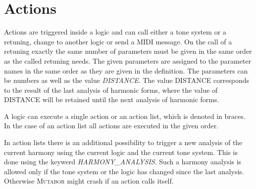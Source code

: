     

\section{Actions}\label{sec:aktionen}

Actions are triggered inside a logic and can call either a
tone system or a retuning, change to another logic or send a MIDI
message. On the call of a retuning exactly the same number of
parameters must be given in the same order as the
called retuning needs. The given parameters are assigned to the
parameter names in the same order as they are given in the
definition. The parameters can be numbers as well as the value
\textit{DISTANCE}. The value DISTANCE corresponds to
the result of the last analysis of harmonic forms, where the value of
DISTANCE will be retained until the next analysis of harmonic forms.

\iffalse
Aktionen werden innerhalb einer Logik ausgelöst und können wahlweise
ein Tonsystem aufrufen, eine Umstimmung aufrufen,
zu einer Logik wechseln oder eine MIDI-Nachricht
senden. Beim Aufruf einer Umstimmung müssen genau so viele Parameter\index{Parameter}
mitgegeben werden, wie die aufgerufene Umstimmung benötigt. Die mitgegebenen
Parameter werden in der gleichen Reihenfolge den Parameter-Namen
der Umstimmung zugeordnet. Als Parameter können Zahlen angegeben werden,
sowie der Wert {\it ABSTAND}\index{ABSTAND}.
Der Wert ABSTAND entspricht den Gegebenheiten der
zuletzt durchgeführten Harmonie-FORM-Analyse, wobei der Wert
ABSTAND bis zur nächsten Harmonie-FORM-Analyse beibehalten wird.
\fi

A logic can execute a single action or an action list, which is
denoted in braces. In the case of an action list all actions are
executed in the given order.

\iffalse
Eine Logik kann eine einzelne Aktion ausführen oder eine in geschweiften
Klammern stehende Aktions-Liste aus\-füh\-ren. Im Falle der Aktions-Liste
werden die einzelnen Aktionen der Liste in genau der angegebenen
Reihenfolge ausgeführt.
\fi

In action lists there is an additional possibility to trigger a new
analysis of the current harmony using the current logic and the
current tone system. This is done using the keywerd
\emph{HARMONY_ANALYSIS}. Such a harmony
analysis is allowed only if the tone system or the logic has changed
since the last analysis. Otherwise \textsc{Mutabor} might crash if an
action calls itself.

